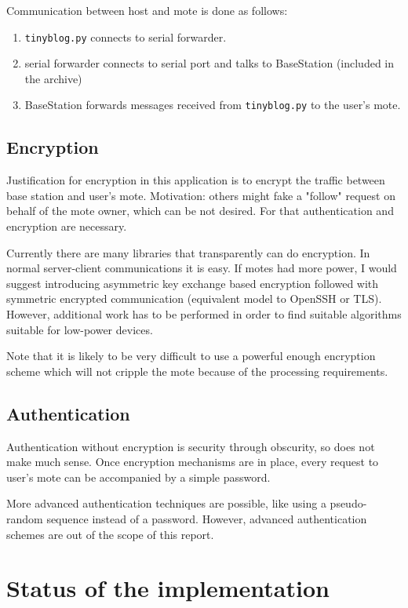 \documentclass[english,11pt]{article}
\numberwithin{equation}{section}
\begin{document}
Communication between host and mote is done as follows:
\begin{enumerate}
    \item \texttt{tinyblog.py} connects to serial forwarder.
    \item serial forwarder connects to serial port and talks to BaseStation
        (included in the archive)
    \item BaseStation forwards messages received from \texttt{tinyblog.py} to
        the user's mote.
\end{enumerate}

\subsection{Encryption}

Justification for encryption in this application is to encrypt the traffic
between base station and user's mote. Motivation: others might fake a "follow"
request on behalf of the mote owner, which can be not desired. For that
authentication and encryption are necessary.

Currently there are many libraries that transparently can do encryption. In
normal server-client communications it is easy. If motes had more power, I would
suggest introducing asymmetric key exchange based encryption followed with
symmetric encrypted communication (equivalent model to OpenSSH or TLS). However,
additional work has to be performed in order to find suitable algorithms
suitable for low-power devices.

Note that it is likely to be very difficult to use a powerful enough encryption
scheme which will not cripple the mote because of the processing requirements.

\subsection{Authentication}

Authentication without encryption is security through obscurity, so does not
make much sense. Once encryption mechanisms are in place, every request to
user's mote can be accompanied by a simple password.

More advanced authentication techniques are possible, like using a pseudo-random
sequence instead of a password. However, advanced authentication schemes are out
of the scope of this report.

\section{Status of the implementation}
\end{document}
